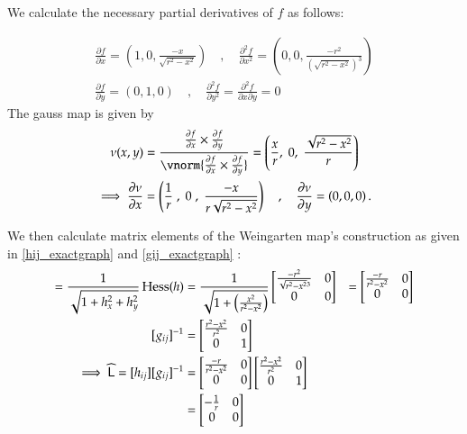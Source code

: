   
  We calculate the necessary partial derivatives of $f$ as follows:
  
  \begin{gather}
  \frac{\partial f}{\partial x} = \left(1, 0, \frac{-x}{\sqrt{r^2 - x^2}}\right)
  \quad , \quad
  \frac{\partial^2 f}{\partial x^2} = \left(0, 0, \frac{-r^2}{\left(\sqrt{r^2 - x^2}\right)^3}\right) \\
  \frac{\partial f}{\partial y} = \left(0, 1, 0\right)
  \quad , \quad
  \frac{\partial^2 f}{\partial y^2} = \frac{\partial^2 f}{\partial x \partial y} = 0
  \end{gather}
  The gauss map is given by
  \begin{gather}
  \nu(x,y) = \frac{\frac{\partial f}{\partial x} \times \frac{\partial f}{\partial y}}
  {\vnorm{\frac{\partial f}{\partial x} \times \frac{\partial f}{\partial y}}}
  = \left( \frac{x}{r} ,\; 0 ,\; \frac{\sqrt{r^2 - x^2}}{r} \right) \\
\implies
\frac{\partial \nu}{\partial x}
 = \left(\frac{1}{r} \;,\; 0\;,\; \frac{-x}{r\sqrt{r^2-x^2}}\right)
 \quad , \quad \frac{\partial \nu}{\partial y} = \left(0,0,0\right).
  \end{gather}
  
  We then calculate matrix elements of the Weingarten map's construction as given in
  \cref{hij_exactgraph} and \cref{gij_exactgraph} :
  \begin{align}
  [h_{ij}] = \frac{1}{\sqrt{1+h_x^2 + h_y^2}} \,  \Hess (h)
     &= \frac{1}{\sqrt{1+\left(\frac{x^2}{r^2-x^2}\right)}}
     \begin{bmatrix}
     \frac{-r^2}{\sqrt{r^2 - x^2}^3} & 0 \\
    0 & 0
     \end{bmatrix} 
     &= \begin{bmatrix}
     \frac{-r}{r^2 - x^2} & 0 \\
     0 & 0
     \end{bmatrix} \\
     [g_{ij}]^{-1} &= \begin{bmatrix} \frac{r^2 - x^2}{r^2} & 0 \\ 0 & 1 \end{bmatrix} \\
     \implies \weinmat = [h_{ij}]	[g_{ij}]^{-1} &=
     \begin{bmatrix}
     \frac{-r}{r^2 - x^2} & 0 \\
     0 & 0
     \end{bmatrix} \begin{bmatrix} \frac{r^2 - x^2}{r^2} & 0 \\ 0 & 1 \end{bmatrix} \\
     &= \begin{bmatrix} - \frac{1}{r} & 0 \\ 0 & 0 	\end{bmatrix}	       	
  \end{align}
  
